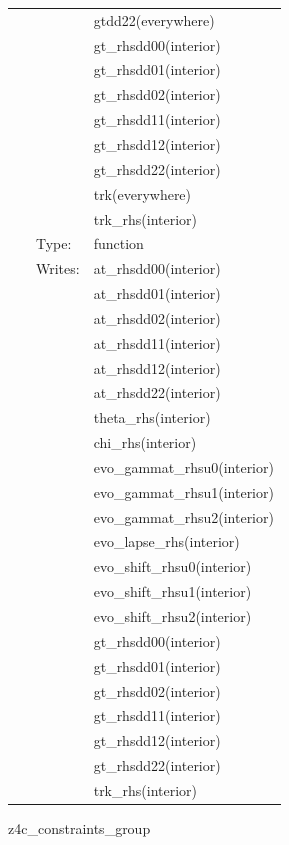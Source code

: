\begin{tabular*}{160mm}{cll}
~& ~ &gtdd22(everywhere)\\ 
~& ~ &gt\_rhsdd00(interior)\\ 
~& ~ &gt\_rhsdd01(interior)\\ 
~& ~ &gt\_rhsdd02(interior)\\ 
~& ~ &gt\_rhsdd11(interior)\\ 
~& ~ &gt\_rhsdd12(interior)\\ 
~& ~ &gt\_rhsdd22(interior)\\ 
~& ~ &trk(everywhere)\\ 
~& ~ &trk\_rhs(interior)\\ 
~ & Type:  & function \\ 
~ & Writes:  & at\_rhsdd00(interior) \\ 
~& ~ &at\_rhsdd01(interior)\\ 
~& ~ &at\_rhsdd02(interior)\\ 
~& ~ &at\_rhsdd11(interior)\\ 
~& ~ &at\_rhsdd12(interior)\\ 
~& ~ &at\_rhsdd22(interior)\\ 
~& ~ &theta\_rhs(interior)\\ 
~& ~ &chi\_rhs(interior)\\ 
~& ~ &evo\_gammat\_rhsu0(interior)\\ 
~& ~ &evo\_gammat\_rhsu1(interior)\\ 
~& ~ &evo\_gammat\_rhsu2(interior)\\ 
~& ~ &evo\_lapse\_rhs(interior)\\ 
~& ~ &evo\_shift\_rhsu0(interior)\\ 
~& ~ &evo\_shift\_rhsu1(interior)\\ 
~& ~ &evo\_shift\_rhsu2(interior)\\ 
~& ~ &gt\_rhsdd00(interior)\\ 
~& ~ &gt\_rhsdd01(interior)\\ 
~& ~ &gt\_rhsdd02(interior)\\ 
~& ~ &gt\_rhsdd11(interior)\\ 
~& ~ &gt\_rhsdd12(interior)\\ 
~& ~ &gt\_rhsdd22(interior)\\ 
~& ~ &trk\_rhs(interior)\\ 
\end{tabular*} 


\vspace{5mm}


\hspace{5mm} z4c\_constraints\_group 

